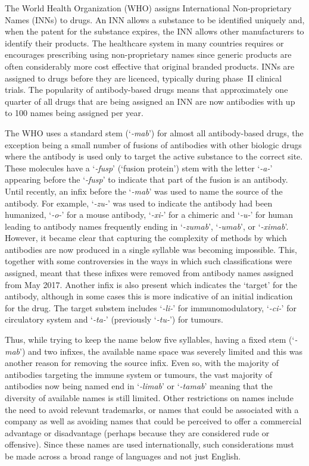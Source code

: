 \documentclass{article}
\newcommand{\eg}[1]{`\emph{#1}'}
\begin{document}
The World Health Organization (WHO) assigns International
Non-proprietary Names (INNs) to drugs. An INN allows a substance to be
identified uniquely and, when the patent for the substance expires,
the INN allows other manufacturers to identify their products. The
healthcare system in many countries requires or encourages prescribing
using non-proprietary names since generic products are often
considerably more cost effective that original branded products. INNs
are assigned to drugs before they are licenced, typically during
phase~II clinical trials. The popularity of antibody-based drugs means
that approximately one quarter of all drugs that are being assigned an
INN are now antibodies with up to 100 names being assigned per year.

The WHO uses a standard stem (\eg{-mab}) for almost all antibody-based
drugs, the exception being a small number of fusions of antibodies
with other biologic drugs where the antibody is used only to target
the active substance to the correct site. These molecules have a
\eg{-fusp} (`fusion protein') stem with the letter \eg{-a-} appearing
before the \eg{-fusp} to indicate that part of the fusion is an
antibody. Until recently, an infix before the \eg{-mab} was used to
name the source of the antibody. For example, \eg{-zu-} was used to
indicate the antibody had been humanized, \eg{-o-} for a mouse
antibody, \eg{-xi-} for a chimeric and \eg{-u-} for
human\cite{inn:stembook} leading to antibody names frequently ending
in \eg{-zumab}, \eg{-umab}, or \eg{-ximab}. However, it became clear
that capturing the complexity of methods by which antibodies are now
produced in a single syllable was becoming impossible. This, together
with some controversies in the ways in which such classifications were
assigned, meant that these infixes were removed from antibody names
assigned from May 2017\cite{inn:2017scheme,parren:names2017}. Another
infix is also present which indicates the `target' for the antibody,
although in some cases this is more indicative of an initial
indication for the drug. The target substem includes \eg{-li-} for
immunomodulatory, \eg{-ci-} for circulatory system and \eg{-ta-}
(previously \eg{-tu-}) for tumours.

Thus, while trying to keep the name below five syllables, having a
fixed stem (\eg{-mab}) and two infixes, the available name space was
severely limited and this was another reason for removing the source
infix. Even so, with the majority of antibodies targeting the immune
system or tumours, the vast majority of antibodies now being named end
in \eg{-limab} or \eg{-tamab} meaning that the diversity of available
names is still limited. Other restrictions on names include the need
to avoid relevant trademarks, or names that could be associated with a
company as well as avoiding names that could be perceived to offer a
commercial advantage or disadvantage (perhaps because they are
considered rude or offensive). Since these names are used
internationally, such considerations must be made across a broad range
of languages and not just English.
\end{document}
